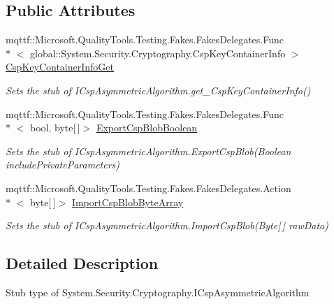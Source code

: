 \subsection*{Public Attributes}
\begin{DoxyCompactItemize}
\item 
mqttf\-::\-Microsoft.\-Quality\-Tools.\-Testing.\-Fakes.\-Fakes\-Delegates.\-Func\\*
$<$ global\-::\-System.\-Security.\-Cryptography.\-Csp\-Key\-Container\-Info $>$ \hyperlink{class_system_1_1_security_1_1_cryptography_1_1_fakes_1_1_stub_i_csp_asymmetric_algorithm_a2f1b39f012b03cb8dc9b505d4b83c593}{Csp\-Key\-Container\-Info\-Get}
\begin{DoxyCompactList}\small\item\em Sets the stub of I\-Csp\-Asymmetric\-Algorithm.\-get\-\_\-\-Csp\-Key\-Container\-Info()\end{DoxyCompactList}\item 
mqttf\-::\-Microsoft.\-Quality\-Tools.\-Testing.\-Fakes.\-Fakes\-Delegates.\-Func\\*
$<$ bool, byte\mbox{[}$\,$\mbox{]}$>$ \hyperlink{class_system_1_1_security_1_1_cryptography_1_1_fakes_1_1_stub_i_csp_asymmetric_algorithm_a91f461f7327ecaf23190042620b16e7a}{Export\-Csp\-Blob\-Boolean}
\begin{DoxyCompactList}\small\item\em Sets the stub of I\-Csp\-Asymmetric\-Algorithm.\-Export\-Csp\-Blob(\-Boolean include\-Private\-Parameters)\end{DoxyCompactList}\item 
mqttf\-::\-Microsoft.\-Quality\-Tools.\-Testing.\-Fakes.\-Fakes\-Delegates.\-Action\\*
$<$ byte\mbox{[}$\,$\mbox{]}$>$ \hyperlink{class_system_1_1_security_1_1_cryptography_1_1_fakes_1_1_stub_i_csp_asymmetric_algorithm_a025105b61f9ea19b2d5838e2714770fd}{Import\-Csp\-Blob\-Byte\-Array}
\begin{DoxyCompactList}\small\item\em Sets the stub of I\-Csp\-Asymmetric\-Algorithm.\-Import\-Csp\-Blob(\-Byte\mbox{[}$\,$\mbox{]} raw\-Data)\end{DoxyCompactList}\end{DoxyCompactItemize}


\subsection{Detailed Description}
Stub type of System.\-Security.\-Cryptography.\-I\-Csp\-Asymmetric\-Algorithm



